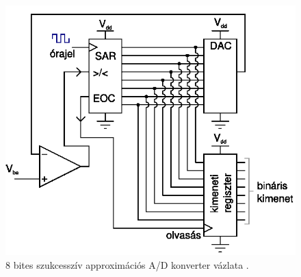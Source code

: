 \documentclass[12pt]{article}
\theoremstyle{plain}
\begin{document}
\begin{figure}[]
	\centering
	\includegraphics[width=0.7\linewidth]{media/ADC_SAR}
	\caption{8 bites szukcesszív approximációs A/D konverter vázlata \cite{Bagoly}.}
	\label{fig:adcsar}
\end{figure}
\end{document}
